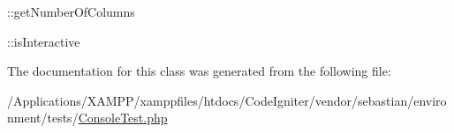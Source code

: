 \+::get\+Number\+Of\+Columns

\+::is\+Interactive 

The documentation for this class was generated from the following file\+:\begin{DoxyCompactItemize}
\item 
/\+Applications/\+X\+A\+M\+P\+P/xamppfiles/htdocs/\+Code\+Igniter/vendor/sebastian/environment/tests/\mbox{\hyperlink{_console_test_8php}{Console\+Test.\+php}}\end{DoxyCompactItemize}

